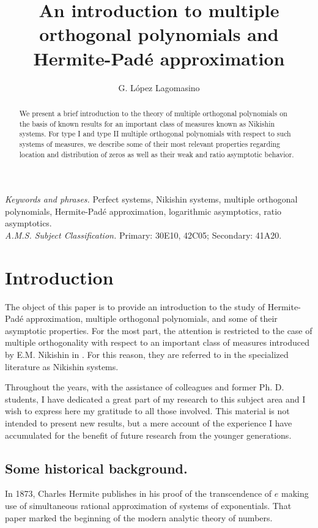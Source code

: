 \documentclass{amsart}
\title[An introduction to multiple orthogonal polynomials and Hermite-Pad\'e approximation] {An introduction to multiple orthogonal polynomials and Hermite-Pad\'e approximation}
\author[L\'{o}pez]{G. L\'opez Lagomasino}
\theoremstyle{definition}
\theoremstyle{remark}
\begin{document}
\maketitle

\begin{abstract}
We present a brief introduction to the theory of multiple orthogonal polynomials on the basis of known results for an important class of measures known as Nikishin systems. For type I and type II multiple orthogonal polynomials with respect to such systems of measures, we describe some of their  most relevant properties regarding location and distribution of zeros as well as their weak and ratio asymptotic behavior.
\end{abstract}

\vspace{1cm}

{\it Keywords and phrases.} Perfect systems, Nikishin systems, multiple orthogonal polynomials, Hermite-Pad\'e  approximation, logarithmic
asymptotics, ratio asymptotics.\\

{\it A.M.S. Subject Classification.} Primary: 30E10, 42C05;
Secondary: 41A20.


\section{Introduction} \label{sec:HP}

The object of this paper is to provide an introduction to the study of Hermite-Pad\'e approximation, multiple orthogonal polynomials, and some of their asymptotic properties. For the most part, the attention is restricted to the case of multiple orthogonality with respect to an important class of measures introduced by E.M. Nikishin in \cite{Nik}. For this reason, they are referred to in the specialized literature as  Nikishin systems.

Throughout the years, with the assistance of colleagues and former Ph. D. students, I have dedicated a great part of my research to this subject area and I wish to express here my gratitude to all those involved. This material is not intended to present new results, but a mere account of the experience I have accumulated for the benefit of future research from the younger generations.

\subsection{Some historical background.}
In 1873, Charles Hermite publishes in \cite{Her} his proof of the transcendence of $e$ making use of simultaneous rational approximation of systems of exponentials. That paper marked the beginning of the modern analytic theory of numbers.
\end{document}
